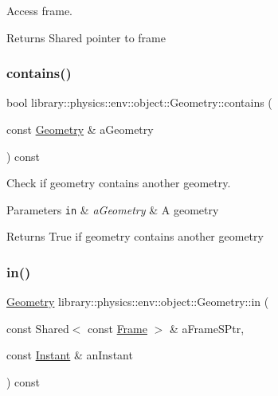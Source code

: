 Access frame. 

\begin{DoxyReturn}{Returns}
Shared pointer to frame 
\end{DoxyReturn}
\mbox{\label{classlibrary_1_1physics_1_1env_1_1object_1_1_geometry_a9122be6cc4de97bb7aec4ad66bee823d}} 
\subsubsection{\texorpdfstring{contains()}{contains()}}
{\footnotesize\ttfamily bool library\+::physics\+::env\+::object\+::\+Geometry\+::contains (\begin{DoxyParamCaption}\item[{const \hyperlink{classlibrary_1_1physics_1_1env_1_1object_1_1_geometry}{Geometry} \&}]{a\+Geometry }\end{DoxyParamCaption}) const}



Check if geometry contains another geometry. 


\begin{DoxyParams}[1]{Parameters}
\mbox{\tt in}  & {\em a\+Geometry} & A geometry \\
\hline
\end{DoxyParams}
\begin{DoxyReturn}{Returns}
True if geometry contains another geometry 
\end{DoxyReturn}
\mbox{\label{classlibrary_1_1physics_1_1env_1_1object_1_1_geometry_a3538be01a00bf3aae3c1fbc0e7f4fb6b}} 
\subsubsection{\texorpdfstring{in()}{in()}}
{\footnotesize\ttfamily \hyperlink{classlibrary_1_1physics_1_1env_1_1object_1_1_geometry}{Geometry} library\+::physics\+::env\+::object\+::\+Geometry\+::in (\begin{DoxyParamCaption}\item[{const Shared$<$ const \hyperlink{classlibrary_1_1physics_1_1coord_1_1_frame}{Frame} $>$ \&}]{a\+Frame\+S\+Ptr,  }\item[{const \hyperlink{classlibrary_1_1physics_1_1time_1_1_instant}{Instant} \&}]{an\+Instant }\end{DoxyParamCaption}) const}



